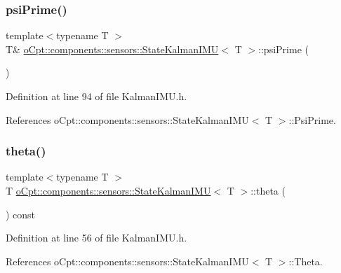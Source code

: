 \subsubsection{\texorpdfstring{psi\+Prime()}{psiPrime()}\hspace{0.1cm}{\footnotesize\ttfamily [2/2]}}
{\footnotesize\ttfamily template$<$typename T $>$ \\
T\& \hyperlink{classo_cpt_1_1components_1_1sensors_1_1_state_kalman_i_m_u}{o\+Cpt\+::components\+::sensors\+::\+State\+Kalman\+I\+MU}$<$ T $>$\+::psi\+Prime (\begin{DoxyParamCaption}{ }\end{DoxyParamCaption})\hspace{0.3cm}{\ttfamily [inline]}}



Definition at line 94 of file Kalman\+I\+M\+U.\+h.



References o\+Cpt\+::components\+::sensors\+::\+State\+Kalman\+I\+M\+U$<$ T $>$\+::\+Psi\+Prime.

\hypertarget{classo_cpt_1_1components_1_1sensors_1_1_state_kalman_i_m_u_ab12a6b15e2f34e35e02c35df79936011}{}\label{classo_cpt_1_1components_1_1sensors_1_1_state_kalman_i_m_u_ab12a6b15e2f34e35e02c35df79936011} 
\subsubsection{\texorpdfstring{theta()}{theta()}\hspace{0.1cm}{\footnotesize\ttfamily [1/2]}}
{\footnotesize\ttfamily template$<$typename T $>$ \\
T \hyperlink{classo_cpt_1_1components_1_1sensors_1_1_state_kalman_i_m_u}{o\+Cpt\+::components\+::sensors\+::\+State\+Kalman\+I\+MU}$<$ T $>$\+::theta (\begin{DoxyParamCaption}{ }\end{DoxyParamCaption}) const\hspace{0.3cm}{\ttfamily [inline]}}



Definition at line 56 of file Kalman\+I\+M\+U.\+h.



References o\+Cpt\+::components\+::sensors\+::\+State\+Kalman\+I\+M\+U$<$ T $>$\+::\+Theta.



